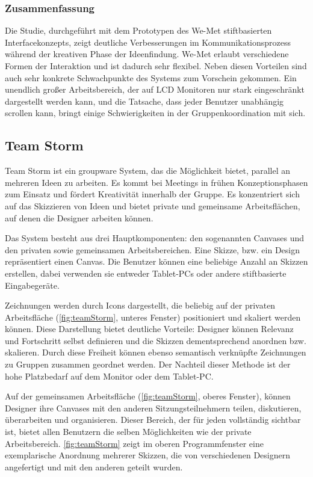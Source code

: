 \subsubsection{Zusammenfassung}
Die Studie, durchgeführt mit dem Prototypen des We-Met stiftbasierten Interfacekonzepts, zeigt deutliche Verbesserungen im Kommunikationsprozess während der kreativen Phase der Ideenfindung. We-Met erlaubt verschiedene Formen der Interaktion und ist dadurch sehr flexibel. Neben diesen Vorteilen sind auch sehr konkrete Schwachpunkte des Systems zum Vorschein gekommen. Ein unendlich großer Arbeitsbereich, der auf LCD Monitoren nur stark eingeschränkt dargestellt werden kann, und die Tatsache, dass jeder Benutzer unabhängig scrollen kann, bringt einige Schwierigkeiten in der Gruppenkoordination mit sich.


\subsection{Team Storm}
Team Storm \citep{Hailpern:2007p113} ist ein groupware System, das die Möglichkeit bietet, parallel an mehreren Ideen zu arbeiten. Es kommt bei Meetings in frühen Konzeptionsphasen zum Einsatz und fördert Kreativität innerhalb der Gruppe. Es konzentriert sich auf das Skizzieren von Ideen und bietet private und gemeinsame Arbeitsflächen, auf denen die Designer arbeiten können.

Das System besteht aus drei Hauptkomponenten: den sogenannten Canvases und den privaten sowie gemeinsamen Arbeitsbereichen. Eine Skizze, bzw. ein Design repräsentiert einen Canvas. Die Benutzer können eine beliebige Anzahl an Skizzen erstellen, dabei verwenden sie entweder Tablet-PCs oder andere stiftbasierte Eingabegeräte. 

Zeichnungen werden durch Icons dargestellt, die beliebig auf der privaten Arbeitsfläche (\autoref{fig:teamStorm}, unteres Fenster) positioniert und skaliert werden können. Diese Darstellung bietet deutliche Vorteile: Designer können Relevanz und Fortschritt selbst definieren und die Skizzen dementsprechend anordnen bzw. skalieren. Durch diese Freiheit können ebenso semantisch verknüpfte Zeichnungen zu Gruppen zusammen geordnet werden. Der Nachteil dieser Methode ist der hohe Platzbedarf auf dem Monitor oder dem Tablet-PC.

Auf der gemeinsamen Arbeitsfläche (\autoref{fig:teamStorm}, oberes Fenster), können Designer ihre Canvases mit den anderen Sitzungsteilnehmern teilen, diskutieren, überarbeiten und organisieren. Dieser Bereich, der für jeden vollständig sichtbar ist, bietet allen Benutzern die selben Möglichkeiten wie der private Arbeitsbereich. \autoref{fig:teamStorm} zeigt im oberen Programmfenster eine exemplarische Anordnung mehrerer Skizzen, die von verschiedenen Designern angefertigt und mit den anderen geteilt wurden. \\

